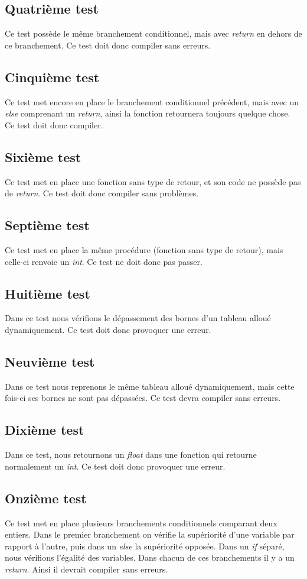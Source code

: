 \documentclass[a4paper,11pt]{article}
\begin{document}
\subsection{Quatrième test}
Ce test possède le même branchement conditionnel, mais avec \textit{return} en dehors de ce branchement. Ce test doit donc compiler sans erreurs.
\subsection{Cinquième test}
Ce test met encore en place le branchement conditionnel précédent, mais avec un \textit{else} comprenant un \textit{return}, ainsi la fonction retournera toujours quelque chose. Ce test doit donc compiler.
\subsection{Sixième test}
Ce test met en place une fonction sans type de retour, et son code ne possède pas de \textit{return}. Ce test doit donc compiler sans problèmes.
\subsection{Septième test}
Ce test met en place la même procédure (fonction sans type de retour), mais celle-ci renvoie un \textit{int}. Ce test ne doit donc pas passer.
\subsection{Huitième test}
Dans ce test nous vérifions le dépassement des bornes d'un tableau alloué dynamiquement. Ce test doit donc provoquer une erreur.
\subsection{Neuvième test}
Dans ce test nous reprenons le même tableau alloué dynamiquement, mais cette fois-ci ses bornes ne sont pas dépassées. Ce test devra compiler sans erreurs.
\subsection{Dixième test}
Dans ce test, nous retournons un \textit{float} dans une fonction qui retourne normalement un \textit{int}. Ce test doit donc provoquer une erreur.
\subsection{Onzième test}
Ce test met en place plusieurs branchements conditionnels comparant deux entiers. Dans le premier branchement on vérifie la supériorité d'une variable par rapport à l'autre, puis dans un \textit{else} la supériorité opposée. Dans un \textit{if} séparé, nous vérifions l'égalité des variables. Dans chacun de ces branchements il y a un \textit{return}. Ainsi il devrait compiler sans erreurs.
\end{document}

